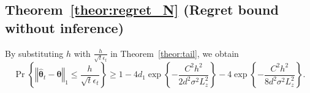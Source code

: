 \documentclass[12pt]{article}
\begin{document}
\subsection{Theorem~\ref{theor:regret_N} (Regret bound without inference)}
\label{app:regret_N}

By substituting $h$ with $\tfrac{h}{\sqrt{t}\epsilon_t}$ in Theorem~\ref{theor:tail}, we obtain
\begin{equation}
\label{equ9}
\Pr\!\left\{\left\Vert  \widehat{\bm{\theta}}_{t} - \bm{\theta} \right\Vert_1 
    \le \frac{h}{\sqrt{t}\epsilon_t} \right\} \ge 1- 4d_1 \exp \left\{-\frac{C^2 h^2}{2d^2\sigma^2 L_z^2}\right\} - 4\exp \left\{-\frac{C^2 h^2}{8d^2\sigma^2 L_z^2}\right\}.
\end{equation}
\end{document}
